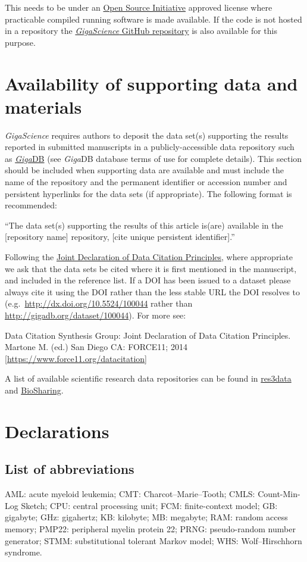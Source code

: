 \documentclass[a4paper,num-refs]{oup-contemporary}
\begin{document}
This needs to be under an \href{http:/opensource.org/licenses}{Open Source Initiative} approved license where practicable compiled running software is made available. If the code is not hosted in a repository the \href{https://github.com/gigascience}{\textit{GigaScience} GitHub repository} is also available for this purpose.

\section{Availability of supporting data and materials}

\textit{GigaScience} requires authors to deposit the data set(s) supporting the results reported in submitted manuscripts in a publicly-accessible data repository such as \href{http://gigadb.org/}{\textit{Giga}DB} (see \textit{Giga}DB database terms of use for complete details). This section should be included when supporting data are available and must include the name of the repository and the permanent identifier or accession number and persistent hyperlinks for the data sets (if appropriate). The following format is recommended:

``The data set(s) supporting the results of this article is(are) available in the [repository name] repository, [cite unique persistent identifier].''

Following the \href{https://www.force11.org/group/joint-declaration-data-citation-principles-final}{Joint Declaration of Data Citation Principles}, where appropriate we ask that the data sets be cited where it is first mentioned in the manuscript, and included in the reference list. If a DOI has been issued to a dataset please always cite it using the DOI rather than the less stable URL the DOI resolves to (e.g.~\url{http://dx.doi.org/10.5524/100044} rather than \url{http://gigadb.org/dataset/100044}). For more see:

Data Citation Synthesis Group: Joint Declaration of Data Citation Principles. Martone M. (ed.) San Diego CA: FORCE11; 2014 [\url{https://www.force11.org/datacitation}]

A list of available scientific research data repositories can be found in \href{http://www.re3data.org/}{res3data} and \href{https://biosharing.org/}{BioSharing}.

\section{Declarations}

\subsection{List of abbreviations}
AML: acute myeloid leukemia; CMT: Charcot–Marie–Tooth; CMLS: Count-Min-Log Sketch; CPU: central processing unit; FCM: finite-context model; GB: gigabyte; GHz: gigahertz; KB: kilobyte; MB: megabyte; RAM: random access memory; PMP22: peripheral myelin protein 22; PRNG: pseudo-random number generator; STMM: substitutional tolerant Markov model; WHS: Wolf–Hirschhorn syndrome.
\end{document}
